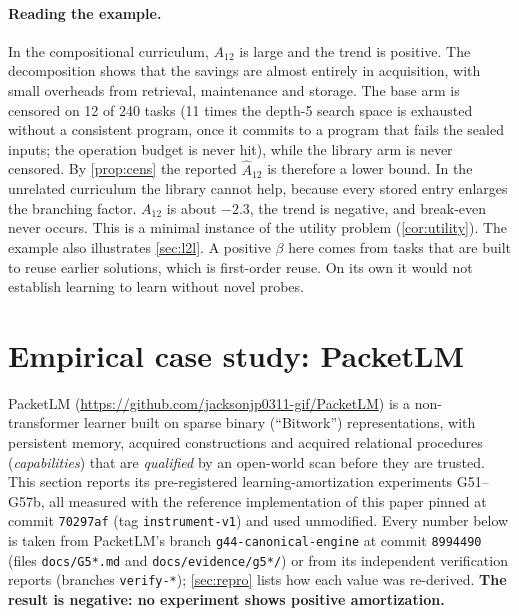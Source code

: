 \documentclass[11pt]{article}
\theoremstyle{remark}
\begin{document}
\paragraph{Reading the example.}
In the compositional curriculum, $A_{12}$ is large and the trend is positive. The decomposition shows that the savings are almost entirely in acquisition, with small overheads from retrieval, maintenance and storage.
The base arm is censored on 12 of 240 tasks (11 times the depth-5 search space is exhausted without a consistent program, once it commits to a program that fails the sealed inputs; the operation budget is never hit), while the library arm is never censored. By \cref{prop:cens} the reported $\hat A_{12}$ is therefore a lower bound.
In the unrelated curriculum the library cannot help, because every stored entry enlarges the branching factor.
$A_{12}$ is about $-2.3$, the trend is negative, and break-even never occurs. This is a minimal instance of the utility problem (\cref{cor:utility}).
The example also illustrates \cref{sec:l2l}. A positive $\beta$ here comes from tasks that are built to reuse earlier solutions, which is first-order reuse. On its own it would not establish learning to learn without novel probes.

\section{Empirical case study: PacketLM}\label{sec:packetlm}

PacketLM (\url{https://github.com/jacksonjp0311-gif/PacketLM}) is a non-transformer learner built on sparse binary (``Bitwork'') representations, with persistent memory, acquired constructions and acquired relational procedures (\emph{capabilities}) that are \emph{qualified} by an open-world scan before they are trusted.
This section reports its pre-registered learning-amortization experiments G51--G57b, all measured with the reference implementation of this paper pinned at commit \texttt{70297af} (tag \texttt{instrument-v1}) and used unmodified.
Every number below is taken from PacketLM's branch \texttt{g44-canonical-engine} at commit \texttt{8994490} (files \texttt{docs/G5*.md} and \texttt{docs/evidence/g5*/}) or from its independent verification reports (branches \texttt{verify-*}); \cref{sec:repro} lists how each value was re-derived.
\textbf{The result is negative: no experiment shows positive amortization.}
\end{document}
